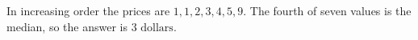 In increasing order the prices are $1,1,2,3,4,5,9$. The fourth of seven values is the median, so the answer is $\boxed{3\text{ dollars}}$.
